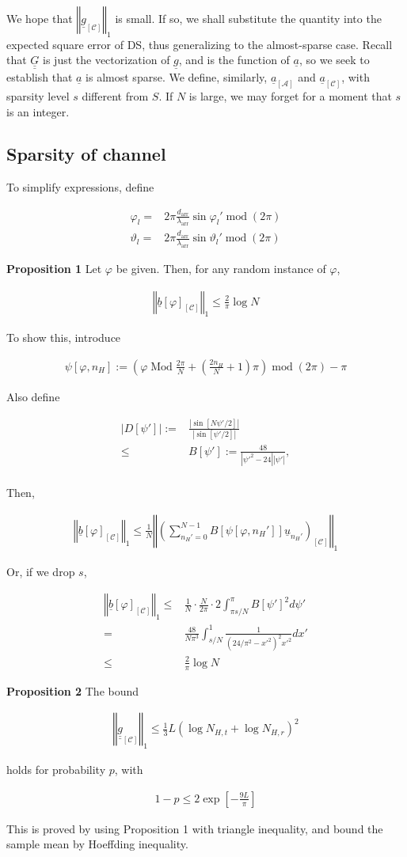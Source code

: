 \documentclass[journal]{IEEEtran}
\newcommand {\f} {\varphi}
\renewcommand {\l} {\lambda}
\renewcommand {\th} {\vartheta}
\newcommand {\D} {\cdot}
\newcommand {\m} [1] {\( #1 \)}
\newcommand {\V} [1] {\underline {#1}}
\newcommand {\M} [1] {\underline {\underline {#1}}}
\newcommand {\RB} [1] {\left( #1 \right)}
\newcommand {\SB} [1] {\left[ #1 \right]}
\newcommand {\Nm} [1] {\left \vert #1 \right \vert}
\newcommand {\VNm} [1] {\left \Vert #1 \right \Vert}
\newcommand {\Disp} [1] {
   \begin {align*}
      #1
   \end {align*}
}
\begin{document}
We hope that \m {\VNm {\V {g} _{\SB{\mathcal {C}}}} _1} is small.
If so, we shall substitute the quantity into the expected square error of DS, thus generalizing to the almost-sparse case.
Recall that \m {\M {G}} is just the vectorization of \m {\V {g}}, and is the function of \m {\V {a}}, so we seek to establish that \m {\V {a}} is almost sparse.
We define, similarly, \m {\V {a} _{\SB{\mathcal {A}}}} and \m {\V {a} _{\SB{\mathcal {C}}}}, with sparsity level \m {s} different from \m {S}.
If \m {N} is large, we may forget for a moment that \m {s} is an integer.

\subsection {Sparsity of channel}

To simplify expressions, define
%
\Disp {
\f_l
= &2\pi \frac {d_{\mathrm {arr}}} {\l_{\mathrm {arr}}} \sin \f_l'
  \; \mathrm {mod}\; \RB {2\pi} \\
%
\th_l
= &2\pi \frac {d_{\mathrm {arr}}} {\l_{\mathrm {arr}}} \sin \th_l'
  \; \mathrm {mod}\; \RB {2\pi} 
}

\textbf {Proposition 1}
Let \m {\f} be given.
Then, for any random instance of \m {\f},
%
\Disp {
\VNm {\V {b} \SB {\f} _{\SB{\mathcal {C}}}} _1
\leq \frac {2} {\pi} \log N 
}

To show this, introduce
\Disp {
\psi \SB {\f, n_H}
:=\RB {
   \f \; \mathrm {Mod}\; \frac {2\pi} {N}
   + \RB {\frac {2 n_H} {N} + 1} \pi
} \;
\mathrm {mod}\; \RB {2\pi}
- \pi 
}
Also define
\Disp {
\Nm {D \SB {\psi'}}
:= &\frac {\Nm {\sin \SB {N \psi'/2}}} {\Nm {\sin \SB {\psi' /2}}} \\
\leq &B \SB {\psi'}
:= \frac {48} {\Nm {\psi'^2 -24} \Nm {\psi'}}, \\
}
Then,
\Disp {
\VNm {\V {b} \SB {\f} _{\SB{\mathcal {C}}}} _1
\leq \frac {1} {N}
\VNm {
\RB {
   \sum_{n_H' =0}^{N -1}
      B \SB {\psi \SB {\f, n_H'}}
      \V {u} _{n_H'}
} _{\SB{\mathcal {C}}}
} _1
}
Or, if we drop \m {s},
\Disp {
\VNm {\V {b} \SB {\f} _{\SB{\mathcal {C}}}} _1
\leq &\frac {1} {N} \D \frac {N} {2\pi} \D 2 \int_{\pi s/N}^{\pi} B \SB {\psi'} ^2 d \psi' \\
= &\frac {48} {N \pi^3}
\int _{s /N} ^1 \frac {1} {\RB {24/\pi^2 -x'^2} ^2 x'^2} dx' \\
\leq &\frac {2} {\pi} \log N 
}

\textbf {Proposition 2}
The bound
\Disp {
\VNm {\M {g} _{\SB{\mathcal {C}}}} _1
\leq \frac {1} {3} L \RB {\log N_{H,t} + \log N_{H,r}} ^2
}
holds for probability \m {p}, with
\Disp {
1 -p
\leq 2 \exp \SB {- \frac {9L} {\pi}} 
}
This is proved by using Proposition 1 with triangle inequality, and bound the sample mean by Hoeffding inequality.
\end{document}

